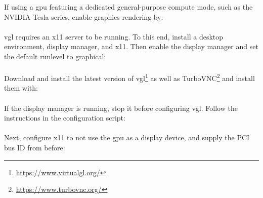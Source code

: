 If using a \gls{gpu} featuring a dedicated general-purpose compute mode, such as the NVIDIA Tesla series, enable graphics rendering by:\\[\baselineskip]
\\[\baselineskip]
\gls{vgl} requires an \gls{x11} server to be running. To this end, install a desktop environment, display manager, and \gls{x11}. Then enable the display manager and set the default runlevel to graphical:\\[\baselineskip]
\\[\baselineskip]
Download and install the latest version of \gls{vgl}\footnote{\url{https://www.virtualgl.org/}} as well as TurboVNC\footnote{\url{https://www.turbovnc.org/}} and install them with:\\[\baselineskip]
\\[\baselineskip]
If the display manager is running, stop it before configuring \gls{vgl}. Follow the instructions in the configuration script:\\[\baselineskip]
\\[\baselineskip]
Next, configure \gls{x11} to not use the \gls{gpu} as a display device, and supply the PCI bus ID from before:\\[\baselineskip]
